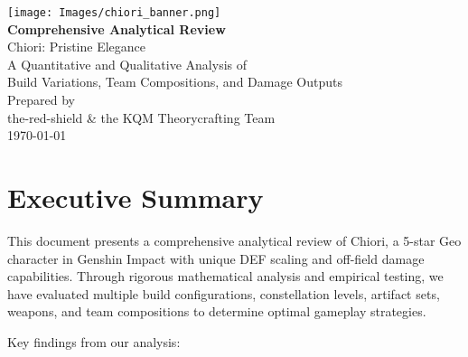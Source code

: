 \documentclass[12pt,a4paper]{article}
\begin{document}
\begin{titlepage}
    \centering
    \vspace*{1cm}
    \texttt{[image: Images/chiori\_banner.png]}\\[1cm]
    {\Huge \textbf{Comprehensive Analytical Review}\\[0.5cm]}
    {\huge \textcolor{geodark}{Chiori: Pristine Elegance}\\[2cm]}
    {\Large A Quantitative and Qualitative Analysis of\\
    Build Variations, Team Compositions, and Damage Outputs\\[2cm]}
    {\large Prepared by\\
    the-red-shield \& the KQM Theorycrafting Team\\[1cm]}
    {\large \today}
    \vfill
\end{titlepage}

\tableofcontents
\newpage

\section{Executive Summary}

This document presents a comprehensive analytical review of Chiori, a 5-star Geo character in Genshin Impact with unique DEF scaling and off-field damage capabilities. Through rigorous mathematical analysis and empirical testing, we have evaluated multiple build configurations, constellation levels, artifact sets, weapons, and team compositions to determine optimal gameplay strategies.

Key findings from our analysis:
\end{document}
